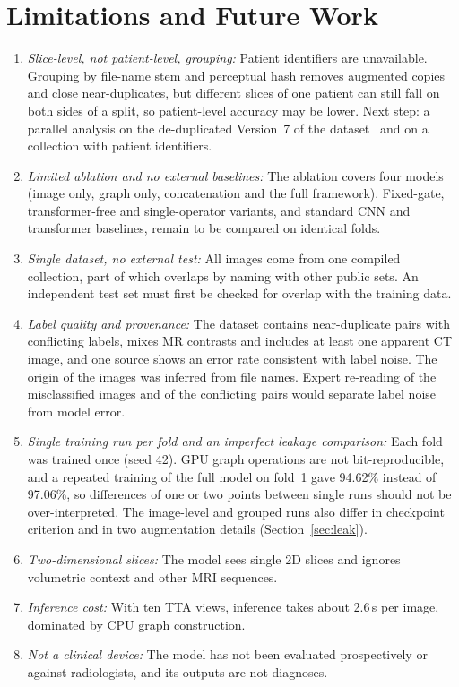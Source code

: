 \documentclass[journal,onecolumn]{IEEEtran}
\begin{document}
\section{Limitations and Future Work}
\begin{enumerate}
\item \textit{Slice-level, not patient-level, grouping:} Patient identifiers are unavailable. Grouping by file-name stem and perceptual hash removes augmented copies and close near-duplicates, but different slices of one patient can still fall on both sides of a split, so patient-level accuracy may be lower. Next step: a parallel analysis on the de-duplicated Version~7 of the dataset~\cite{bdneuro2025v7} and on a collection with patient identifiers.
\item \textit{Limited ablation and no external baselines:} The ablation covers four models (image only, graph only, concatenation and the full framework). Fixed-gate, transformer-free and single-operator variants, and standard CNN and transformer baselines, remain to be compared on identical folds.
\item \textit{Single dataset, no external test:} All images come from one compiled collection, part of which overlaps by naming with other public sets. An independent test set must first be checked for overlap with the training data.
\item \textit{Label quality and provenance:} The dataset contains near-duplicate pairs with conflicting labels, mixes MR contrasts and includes at least one apparent CT image, and one source shows an error rate consistent with label noise. The origin of the images was inferred from file names. Expert re-reading of the misclassified images and of the conflicting pairs would separate label noise from model error.
\item \textit{Single training run per fold and an imperfect leakage comparison:} Each fold was trained once (seed 42). GPU graph operations are not bit-reproducible, and a repeated training of the full model on fold~1 gave 94.62\% instead of 97.06\%, so differences of one or two points between single runs should not be over-interpreted. The image-level and grouped runs also differ in checkpoint criterion and in two augmentation details (Section~\ref{sec:leak}).
\item \textit{Two-dimensional slices:} The model sees single 2D slices and ignores volumetric context and other MRI sequences.
\item \textit{Inference cost:} With ten TTA views, inference takes about 2.6\,s per image, dominated by CPU graph construction.
\item \textit{Not a clinical device:} The model has not been evaluated prospectively or against radiologists, and its outputs are not diagnoses.
\end{enumerate}
\end{document}
